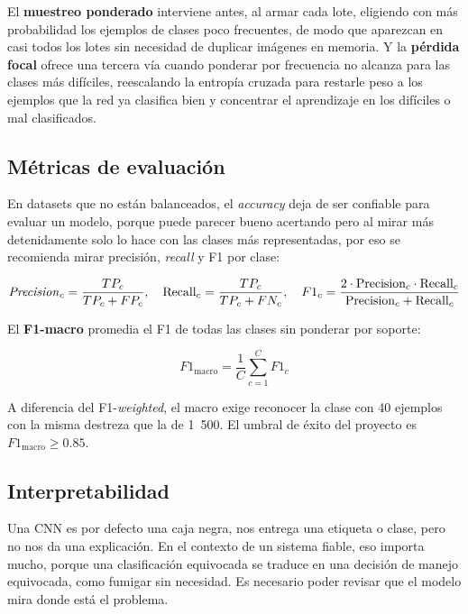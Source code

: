 \documentclass[12pt,letterpaper]{article}
\begin{document}
El \textbf{muestreo ponderado} interviene antes, al armar cada lote, eligiendo con m\'as probabilidad los ejemplos de clases poco frecuentes, de modo que aparezcan en casi todos los lotes sin necesidad de duplicar im\'agenes en memoria. Y la \textbf{p\'erdida focal} ofrece una tercera v\'ia cuando ponderar por frecuencia no alcanza para las clases m\'as dif\'iciles, reescalando la entrop\'ia cruzada para restarle peso a los ejemplos que la red ya clasifica bien y concentrar el aprendizaje en los dif\'iciles o mal clasificados.

\subsection{M\'etricas de evaluaci\'on}

En datasets que no están balanceados, el \textit{accuracy} deja de ser confiable para evaluar un modelo, porque puede parecer bueno acertando pero al mirar más detenidamente solo lo hace con las clases más representadas, por eso se recomienda mirar precisi\'on, \textit{recall} y F1 por clase:

\begin{equation}
\text{\textit{Precision}}_c = \frac{TP_c}{TP_c + FP_c}, \quad \text{Recall}_c = \frac{TP_c}{TP_c + FN_c}, \quad F1_c = \frac{2 \cdot \text{Precision}_c \cdot \text{Recall}_c}{\text{Precision}_c + \text{Recall}_c}
\end{equation}

El \textbf{F1-macro} promedia el F1 de todas las clases sin ponderar por soporte:

\begin{equation}
F1_{\text{macro}} = \frac{1}{C}\sum_{c=1}^{C} F1_c
\end{equation}

A diferencia del F1-\textit{weighted}, el macro exige reconocer la clase con 40 ejemplos con la misma destreza que la de 1~500. El umbral de \'exito del proyecto es $F1_{\text{macro}} \geq 0.85$.

\subsection{Interpretabilidad}

Una CNN es por defecto una caja negra, nos entrega una etiqueta o clase, pero no nos da una explicación. En el contexto de un sistema fiable, eso importa mucho, porque una clasificaci\'on equivocada se traduce en una decisi\'on de manejo equivocada, como fumigar sin necesidad. Es necesario poder revisar que el modelo mira donde est\'a el problema.
\end{document}
